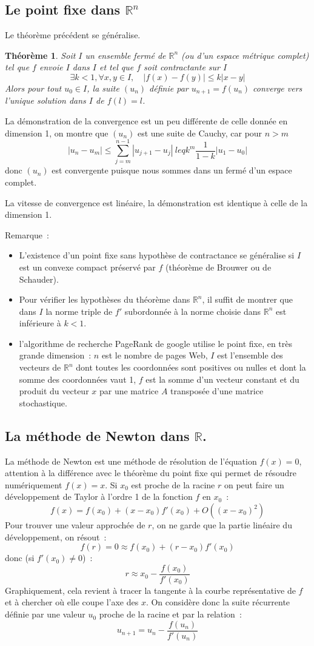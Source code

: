 \documentclass[a4paper,11pt]{article}
\newtheorem{thm}{Théorème}
\newcommand{\R}{{\mathbb{R}}}
\begin{document}
\subsection{Le point fixe dans $\R^n$}
Le th\'eor\`eme pr\'ec\'edent se g\'en\'eralise. 
\begin{thm}
Soit $I$ un ensemble
ferm\'e de $\R^n$ (ou d'un espace m\'etrique complet) tel que $f$ 
envoie $I$ dans $I$ et tel que $f$ soit contractante sur $I$
$$ \exists k<1, \forall x,y \in I, \quad |f(x)-f(y)| \leq k |x-y|$$
Alors pour tout $u_0 \in I$, la suite $(u_n)$ d\'efinie par
$u_{n+1}=f(u_n)$ converge vers l'unique solution dans $I$ de $f(l)=l$.
\end{thm}
La d\'emonstration de la convergence est un peu diff\'erente de celle donn\'ee en
dimension 1, on montre que $(u_n)$ est une suite de Cauchy, car pour $n>m$
$$ |u_n-u_m| \leq \sum_{j=m}^{n-1}|u_{j+1}-u_j | 
\ leq k^m \frac{1}{1-k} |u_1-u_0| $$
donc $(u_n)$ est convergente puisque nous sommes dans un ferm\'e 
d'un espace complet.

La vitesse de convergence est lin\'eaire, la d\'emonstration est
identique \`a celle de la dimension 1.

Remarque~: 
\begin{itemize}
\item L'existence d'un point fixe sans hypoth\`ese de contractance
se g\'en\'eralise si $I$ est un convexe compact pr\'eserv\'e
par $f$ (th\'eor\`eme
de Brouwer ou de Schauder).
\item Pour v\'erifier les hypoth\`eses du th\'eor\`eme dans
$\R^n$, il suffit de montrer que dans $I$ la norme triple de $f'$
subordonn\'ee \`a la norme choisie dans $\R^n$ est inf\'erieure
\`a $k<1$.
\item l'algorithme de recherche
PageRank de google utilise le point fixe, en tr\`es grande dimension~:
$n$ est le nombre de pages Web, $I$ est l'ensemble des vecteurs
de $\R^n$ dont toutes les coordonn\'ees sont positives ou nulles et
dont la somme des coordonn\'ees vaut 1, $f$ est la somme d'un vecteur
constant et du produit du vecteur $x$ par une matrice $A$ transpos\'ee
d'une matrice stochastique.
\end{itemize}

\subsection{La méthode de Newton dans $\R$.}
La méthode de Newton est une méthode de résolution de l'équation
$f(x)=0$, attention à la différence avec le théorème du point fixe
qui permet de résoudre numériquement $f(x)=x$.
Si $x_0$ est proche de la racine $r$
on peut faire un développement de Taylor à l'ordre 1 de la
fonction $f$ en $x_0$~:
\[ f(x)=f(x_0)+(x-x_0)f'(x_0)+O((x-x_0)^2) \]
Pour trouver une valeur approchée de $r$, on ne garde que la partie
linéaire du développement, on résout~:
\[ f(r)=0 \approx f(x_0) + (r-x_0) f'(x_0) \]
donc (si $f'(x_0)\neq 0$)~:
\[ r \approx x_0 -\frac{f(x_0)}{f'(x_0)}\]
Graphiquement, cela revient à tracer la tangente à la courbe représentative
de $f$ et à chercher où elle coupe l'axe des $x$.
On considère donc la suite récurrente définie par une valeur $u_0$
proche de la racine et par la relation~:
\[ u_{n+1} = u_n -\frac{f(u_n)}{f'(u_n)}\]
\end{document}
